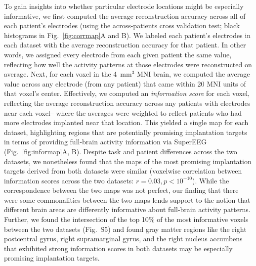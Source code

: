 \documentclass[11pt]{article}
\newcommand{\intersectmap}{S5}
\begin{document}
To gain insights into whether particular electrode locations might be
especially informative, we first computed the average reconstruction
accuracy across all of each patient's electrodes (using the
across-patients cross validation test; black histograms in
Fig.~\ref{fig:corrmap}A and B).  We labeled each patient's electrodes
in each dataset with the average reconstruction accuracy for that
patient.  In other words, we assigned every electrode from each given
patient the same value, reflecting how well the activity patterns at
those electrodes were reconstructed on average.  Next, for each voxel
in the 4~mm$^3$ MNI brain, we computed the average value across any
electrode (from any patient) that came within 20 MNI units of that
voxel's center.  Effectively, we computed an \textit{information
  score} for each voxel, reflecting the average reconstruction
accuracy across any patients with electrodes near each voxel-- where
the averages were weighted to reflect patients who had more electrodes
implanted near that location. This yielded a single map for each
dataset, highlighting regions that are potentially promising
implantation targets in terms of providing full-brain activity
information via SuperEEG (Fig.~\ref{fig:informap}A, B).  Despite task
and patient differences across the two datasets, we nonetheless found
that the maps of the most promising implantation targets derived from
both datasets were similar (voxelwise correlation between information
scores across the two datasets: $r = 0.03, p < 10^{-10}$).  While the
correspondence between the two maps was not perfect, our finding that
there were some commonalities between the two maps lends support to
the notion that different brain areas are differently informative
about full-brain activity patterns.  Further, we found the
intersection of the top 10\% of the most informative voxels between
the two datasets (Fig.~\intersectmap) and found gray matter regions like the right postcentral gyrus, right supramarginal gyrus,
and the right nucleus accumbens that exhibited strong information scores in both datasets may
be especially promising implantation targets.
\end{document}
